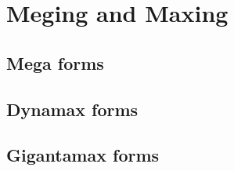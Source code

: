 \chapter{Meging and Maxing}
\label{chap:megmax}

\section{Mega forms}
\label{section:mega}

\section{Dynamax forms}
\label{section:dmax}

\section{Gigantamax forms}
\label{section:gmax}
